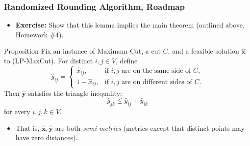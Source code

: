 \documentclass{beamer}
\begin{document}
    \begin{frame}
        \frametitle{Randomized Rounding Algorithm, Roadmap}

        \begin{itemize}
            \item {\bf Exercise:} Show that this lemma implies the main theorem (outlined above, Homework \#4).
        \end{itemize}

        \pause

        \begin{block}{Proposition}
            Fix an instance of {\sc Maximum Cut}, a cut $C$, and a feasible solution $\mathbf{\hat x}$ to {\sc (LP-MaxCut)}. For distinct $i, j \in V$, define
            $$ \hat y_{ij} = \left\{
                \begin{array}{ll}
                    \hat x_{ij}, & \text{if $i, j$ are on the same side of $C$}, \\
                    1 - \hat x_{ij}, & \text{if $i, j$ are on different sides of $C$}.
                \end{array}
            \right. $$
            Then $\mathbf {\hat y}$ satisfies the triangle inequality:
            $$ \hat y_{jk} \leq \hat y_{ij} + \hat y_{ik} $$
            for every $i, j, k \in V$.
        \end{block}

        \pause

        \begin{itemize}
            \item That is, $\mathbf{\hat x}, \mathbf{\hat y}$ are both \emph{semi-metrics} (metrics except that distinct points may have zero distances).
        \end{itemize}
    \end{frame}
\end{document}
